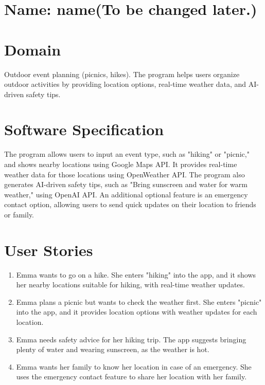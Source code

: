 \documentclass{article}
\begin{document}
\section*{Name: name(To be changed later.)}

\section*{Domain}
Outdoor event planning (picnics, hikes). The program helps users organize outdoor activities by providing location options, real-time weather data, and AI-driven safety tips.

\section*{Software Specification}
The program allows users to input an event type, such as "hiking" or "picnic," and shows nearby locations using Google Maps API. It provides real-time weather data for those locations using OpenWeather API. The program also generates AI-driven safety tips, such as "Bring sunscreen and water for warm weather," using OpenAI API. An additional optional feature is an emergency contact option, allowing users to send quick updates on their location to friends or family.

\section*{User Stories}
\begin{enumerate}
    \item Emma wants to go on a hike. She enters "hiking" into the app, and it shows her nearby locations suitable for hiking, with real-time weather updates. 
    \item Emma plans a picnic but wants to check the weather first. She enters "picnic" into the app, and it provides location options with weather updates for each location.
    \item Emma needs safety advice for her hiking trip. The app suggests bringing plenty of water and wearing sunscreen, as the weather is hot. 
    \item Emma wants her family to know her location in case of an emergency. She uses the emergency contact feature to share her location with her family. 
\end{enumerate}
\end{document}

